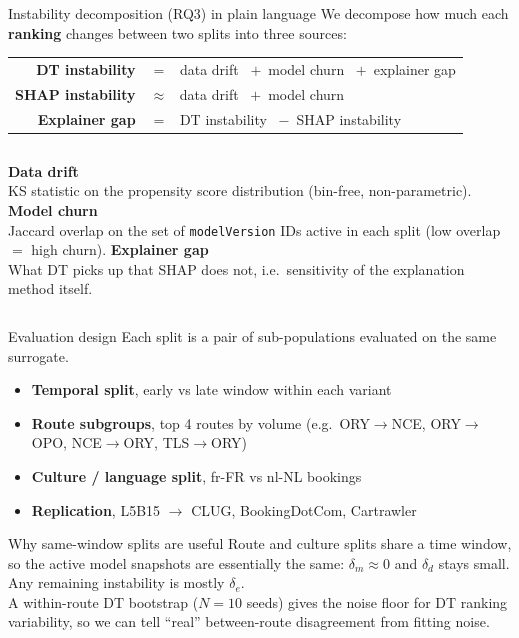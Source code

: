 \documentclass[aspectratio=169,11pt]{beamer}
\begin{document}
\begin{frame}{Instability decomposition (RQ3) in plain language}
  We decompose how much each \textbf{ranking} changes between two splits into three sources:
  \vspace{0.6em}
  \begin{center}
    \begin{tabular}{r l}
      \textbf{DT instability}    & $=$ \ data drift \ $+$\ model churn \ $+$\ explainer gap \\[0.4em]
      \textbf{SHAP instability}  & $\approx$ \ data drift \ $+$\ model churn  \\[0.4em]
      \textbf{Explainer gap}     & $=$ \ DT instability \ $-$\ SHAP instability \\
    \end{tabular}
  \end{center}
  \vspace{0.8em}
  \begin{columns}[T,onlytextwidth]
    \textbf{Data drift}\\
    KS statistic on the propensity score distribution (bin-free, non-parametric).
    \textbf{Model churn}\\
    Jaccard overlap on the set of \texttt{modelVersion} IDs active in each split (low overlap $=$ high churn).
    \textbf{Explainer gap}\\
    What DT picks up that SHAP does not, i.e.\ sensitivity of the explanation method itself.
  \end{columns}
\end{frame}

\begin{frame}{Evaluation design}
  Each split is a pair of sub-populations evaluated on the same surrogate.
  \vspace{0.3em}
  \begin{itemize}
    \item \textbf{Temporal split}, early vs late window within each variant
    \item \textbf{Route subgroups}, top 4 routes by volume (e.g.\ ORY$\to$NCE, ORY$\to$OPO, NCE$\to$ORY, TLS$\to$ORY)
    \item \textbf{Culture / language split}, fr-FR vs nl-NL bookings
    \item \textbf{Replication}, L5B15 $\rightarrow$ CLUG, BookingDotCom, Cartrawler
  \end{itemize}
  \vspace{0.7em}
  \begin{block}{Why same-window splits are useful}
    Route and culture splits share a time window, so the active model snapshots are essentially the same: $\delta_m \approx 0$ and $\delta_d$ stays small. Any remaining instability is mostly $\delta_e$.\\[0.3em]
    A within-route DT bootstrap ($N=10$ seeds) gives the noise floor for DT ranking variability, so we can tell ``real'' between-route disagreement from fitting noise.
  \end{block}
\end{frame}
\end{document}
